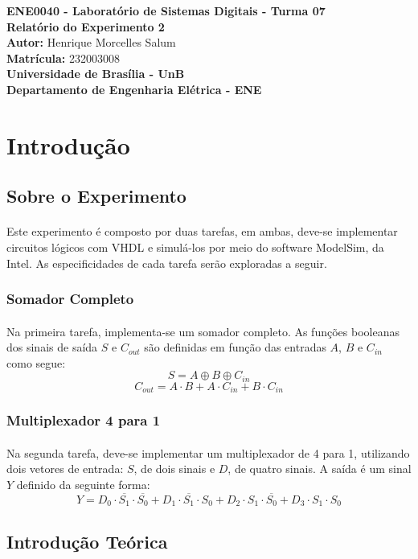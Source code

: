 \documentclass[a4paper,12pt]{article}
\newcommand{\capa}{
    \begin{titlepage}
        \begin{center}
            {\large \textbf{ENE0040 - Laboratório de Sistemas Digitais - Turma 07}} \\
            \vspace{3cm}
            {\Huge \textbf{Relatório do Experimento 2}} \\[1em]
            {\large \textbf{Autor:} Henrique Morcelles Salum} \\[0.5em]
            {\large \textbf{Matrícula:} 232003008} \\
            \vfill
            {\Large \textbf{Universidade de Brasília - UnB}} \\[0.75em]
            {\large \textbf{Departamento de Engenharia Elétrica - ENE}} \\
        \end{center}
    \end{titlepage}
}
\begin{document}
\capa

\newpage
\tableofcontents
\newpage

\section{Introdução}

\subsection{Sobre o Experimento}
\paragraph{}
Este experimento é composto por duas tarefas, em ambas, deve-se implementar circuitos lógicos com VHDL e simulá-los por meio do software ModelSim, da Intel. As especificidades de cada tarefa serão exploradas a seguir.

\subsubsection{Somador Completo}
\paragraph{}
Na primeira tarefa, implementa-se um somador completo. As funções booleanas dos sinais de saída $S$ e $C_{out}$ são definidas em função das entradas $A$, $B$ e $C_{in}$ como segue:
\[
S = A \oplus B \oplus C_{in}
\]
\[
C_{out} = A \cdot B + A \cdot C_{in} + B \cdot C_{in}
\]

\subsubsection{Multiplexador 4 para 1}
\paragraph{}
Na segunda tarefa, deve-se implementar um multiplexador de 4 para 1, utilizando dois vetores de entrada: $S$, de dois sinais e $D$, de quatro sinais. A saída é um sinal $Y$ definido da seguinte forma:
\[
Y = D_0 \cdot \overline{S_1} \cdot \overline{S_0} + D_1 \cdot \overline{S_1} \cdot S_0 + D_2 \cdot S_1 \cdot \overline{S_0} + D_3 \cdot S_1 \cdot S_0
\]

\subsection{Introdução Teórica}
\end{document}
